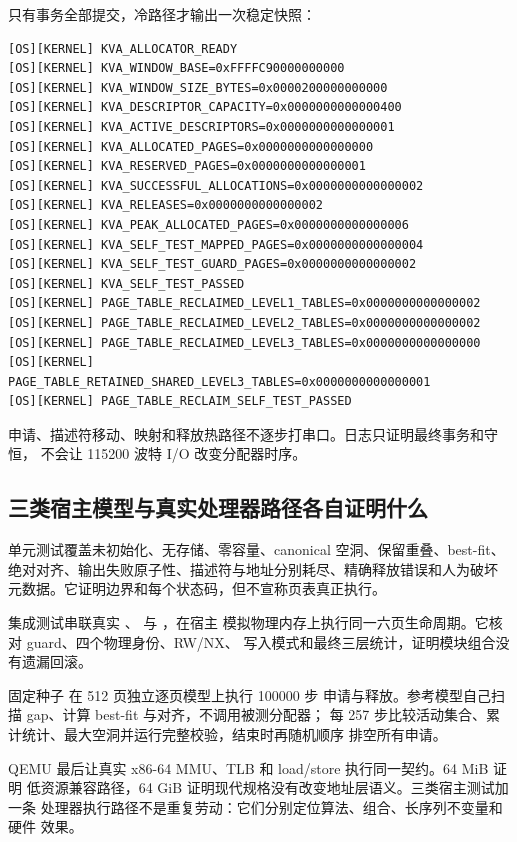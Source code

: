 只有事务全部提交，冷路径才输出一次稳定快照：

\begin{verbatim}
[OS][KERNEL] KVA_ALLOCATOR_READY
[OS][KERNEL] KVA_WINDOW_BASE=0xFFFFC90000000000
[OS][KERNEL] KVA_WINDOW_SIZE_BYTES=0x0000200000000000
[OS][KERNEL] KVA_DESCRIPTOR_CAPACITY=0x0000000000000400
[OS][KERNEL] KVA_ACTIVE_DESCRIPTORS=0x0000000000000001
[OS][KERNEL] KVA_ALLOCATED_PAGES=0x0000000000000000
[OS][KERNEL] KVA_RESERVED_PAGES=0x0000000000000001
[OS][KERNEL] KVA_SUCCESSFUL_ALLOCATIONS=0x0000000000000002
[OS][KERNEL] KVA_RELEASES=0x0000000000000002
[OS][KERNEL] KVA_PEAK_ALLOCATED_PAGES=0x0000000000000006
[OS][KERNEL] KVA_SELF_TEST_MAPPED_PAGES=0x0000000000000004
[OS][KERNEL] KVA_SELF_TEST_GUARD_PAGES=0x0000000000000002
[OS][KERNEL] KVA_SELF_TEST_PASSED
[OS][KERNEL] PAGE_TABLE_RECLAIMED_LEVEL1_TABLES=0x0000000000000002
[OS][KERNEL] PAGE_TABLE_RECLAIMED_LEVEL2_TABLES=0x0000000000000002
[OS][KERNEL] PAGE_TABLE_RECLAIMED_LEVEL3_TABLES=0x0000000000000000
[OS][KERNEL] PAGE_TABLE_RETAINED_SHARED_LEVEL3_TABLES=0x0000000000000001
[OS][KERNEL] PAGE_TABLE_RECLAIM_SELF_TEST_PASSED
\end{verbatim}

申请、描述符移动、映射和释放热路径不逐步打串口。日志只证明最终事务和守恒，
不会让 115200 波特 I/O 改变分配器时序。

\subsection{三类宿主模型与真实处理器路径各自证明什么}

单元测试覆盖未初始化、无存储、零容量、canonical 空洞、保留重叠、best-fit、
绝对对齐、输出失败原子性、描述符与地址分别耗尽、精确释放错误和人为破坏
元数据。它证明边界和每个状态码，但不宣称页表真正执行。

集成测试串联真实 、
 与 ，在宿主
模拟物理内存上执行同一六页生命周期。它核对 guard、四个物理身份、RW/NX、
写入模式和最终三层统计，证明模块组合没有遗漏回滚。

固定种子  在 512 页独立逐页模型上执行 100000 步
申请与释放。参考模型自己扫描 gap、计算 best-fit 与对齐，不调用被测分配器；
每 257 步比较活动集合、累计统计、最大空洞并运行完整校验，结束时再随机顺序
排空所有申请。

QEMU 最后让真实 x86-64 MMU、TLB 和 load/store 执行同一契约。64 MiB 证明
低资源兼容路径，64 GiB 证明现代规格没有改变地址层语义。三类宿主测试加一条
处理器执行路径不是重复劳动：它们分别定位算法、组合、长序列不变量和硬件
效果。

